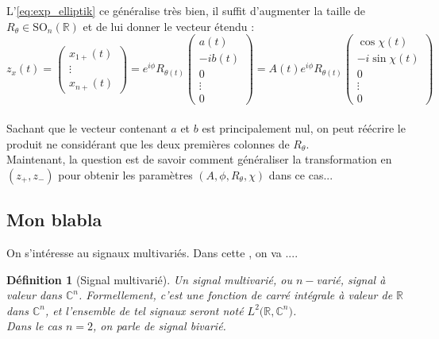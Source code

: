 \documentclass[hidelinks, french, oneside]{article}
\newcommand{\R}{\mathbb{R}}
\newcommand{\C}{\mathbb{C}}
\newcommand{\SO}{\text{SO}}
\theoremstyle{enonce}
\newtheorem{definition}{Définition}
\theoremstyle{special}
\theoremstyle{rqlike}
\theoremstyle{exo}
\theoremstyle{demo}
\begin{document}
L'\cref{eq:exp_elliptik} ce généralise  très bien, il suffit d'augmenter la taille de $R_\theta\in\SO_n(\R)$ et de lui donner le vecteur étendu :
\[z_x(t) = \begin{pmatrix}x_{1+}(t) \\ \vdots \\ 
	x_{n+}(t)\end{pmatrix} = e^{i\phi} R_{\theta(t)}\begin{pmatrix} a(t) \\ -ib(t) \\ 0 \\ \vdots \\ 0 \end{pmatrix} = A(t)e^{i\phi} R_{\theta(t)} \begin{pmatrix} \cos\chi(t) \\ -i\sin\chi(t) \\ 0 \\ \vdots \\ 0 \end{pmatrix}\]
\\
Sachant que le vecteur contenant $a$ et $b$ est principalement nul, on peut réécrire le produit ne considérant que les deux premières colonnes de $R_\theta$.
\\

Maintenant, la question est de savoir comment généraliser la transformation en $(z_+, z_-)$ pour obtenir les paramètres $(A, \phi, R_\theta, \chi)$ dans ce cas...



\subsection{Mon blabla}

On s'intéresse au signaux multivariés. Dans cette , on va ....
\\

\begin{definition}[Signal multivarié] 
Un \textit{signal multivarié}, ou \textit{$n-$varié}, signal à valeur dans $\C^n$. Formellement, c'est une fonction de carré intégrale à valeur de $\R$ dans $\C^n$, et l'ensemble de tel signaux seront noté $L^2\big(\R,\C^n\big)$.
\\
Dans le cas $n=2$, on parle de signal \textit{bivarié}.
\end{definition}
\end{document}
